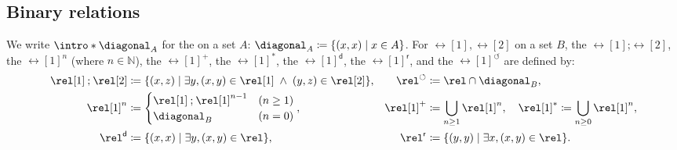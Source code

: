 \documentclass[10pt,a4paper]{article}
\theoremstyle{definition}
\theoremstyle{remark}
\DeclarePairedDelimiter\set{\{}{\}}
\DeclarePairedDelimiter\tuple{(}{)}
\newcommand{\defeq}{\coloneq}
\newcommand{\nat}{\mathbb{N}}
\newcommand{\compo}{\mathbin{;}}
\newcommand{\dom}{\mathsf{d}}
\newcommand{\rng}{\mathsf{r}}
\newcommand{\lop}{\circlearrowleft}
\begin{document}
\subsection{Binary relations}
\AP
We write $\intro*\diagonal_{A}$ for the \intro*{} on a set $A$: $\diagonal_{A} \defeq \set{\tuple{x, x} \mid x \in A}$.
\AP
For \intro*{} $\rel[1], \rel[2]$ on a set $B$, the \intro*{} $\rel[1] \compo \rel[2]$, the \AP
    \intro*{} $\rel[1]^{n}$ (where $n \in \nat$), the \intro*{} $\rel[1]^{+}$, the \intro*{} $\rel[1]^*$,
    the \intro*{} $\rel[1]^{\dom}$,
the \intro*{} $\rel[1]^{\rng}$, and 
the \intro*{} $\rel[1]^{\lop}$
are defined by:
\begin{align*}
    \rel[1] \compo \rel[2] & \defeq \set{\tuple{x, z} \mid \exists y, \tuple{x, y} \in \rel[1] \;\land\;  \tuple{y, z} \in \rel[2]}, &
    \rel^{\lop} &\defeq \rel \cap \diagonal_{B}, \\
    \rel[1]^n             & \defeq \begin{cases}
                                       \rel[1] \compo \rel[1]^{n-1} & (n \ge 1) \\
                                       \diagonal_{B}               & (n = 0)
                                   \end{cases}, &
    \rel[1]^{+}        & \defeq \bigcup_{n \ge 1} \rel[1]^n, \quad
    \rel[1]^*  \defeq \bigcup_{n \ge 0} \rel[1]^n,\\
    \rel^{\dom} &\defeq \set{\tuple{x, x} \mid \exists y, \tuple{x, y} \in \rel}, & 
    \rel^{\rng} &\defeq \set{\tuple{y, y} \mid \exists x, \tuple{x, y} \in \rel}. 
\end{align*}
\end{document}
